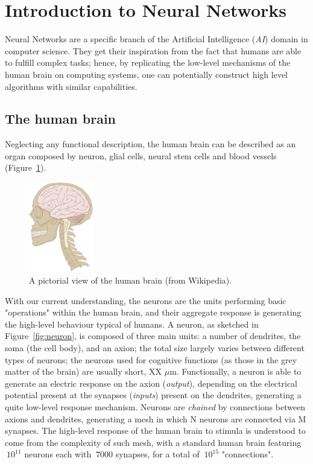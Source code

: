 \section{Introduction to Neural Networks}
Neural Networks are a specific branch of the Artificial Intelligence (\emph{AI}) domain in computer science.
They get their inspiration from the fact that humans are able to fulfill complex tasks; hence, by replicating the low-level mechanisms of the human brain on computing systems, one can potentially construct high level algorithms with similar capabilities.

\subsection{The human brain}
Neglecting any functional description, the human brain can be described as an organ composed by neuron, glial cells, neural stem cells and blood vessels (Figure~\ref{fig:humanbrain}).
\begin{figure}[h]
    \centering
    \includegraphics[width=0.25\textwidth]{images/humanbrain.png}
    \caption{A pictorial view of the human brain (from Wikipedia).}
    \label{fig:humanbrain}
\end{figure}
 With our current understanding, the neurons are the units performing basic "operations" within the human brain, and their aggregate response is generating the high-level behaviour typical of humans.
 A neuron, as sketched in Figure~\ref{fig:neuron}, is composed of three main units: a number of dendrites, the soma (the cell body), and an axion; the total size largely varies between different types of neurons; the neurons used for cognitive functions (as those in the grey matter of the brain) are usually short, XX $\mu$m.
Functionally, a neuron is able to generate an electric response on the axion (\emph{output}), depending on the electrical potential present at the synapses (\emph{inputs}) present on the dendrites, generating a quite low-level response mechanism. Neurons are \emph{chained} by connections between axions and dendrites, generating a mesh in which N neurons are connected via M synapses.
 The high-level response of the human brain to stimula is understood to come from the complexity of such mesh, with a standard human brain featuring $~10^{11}$ neurons each with $~7000$ synapses, for a total of $~10^{15}$ "connections".

